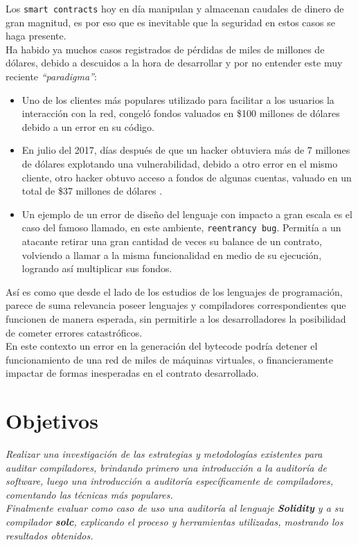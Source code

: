 Los \texttt{smart contracts} hoy en día manipulan y almacenan caudales de dinero de gran magnitud, es por eso que es inevitable que la seguridad en estos casos se haga presente.\\

Ha habido ya muchos casos registrados de pérdidas de miles de millones de dólares, debido a descuidos a la hora de desarrollar y por no entender este muy reciente \textit{“paradigma”}:
\begin{itemize}
\item Uno de los clientes más populares utilizado para facilitar a los usuarios la interacción con la red, congeló fondos valuados en \$100 millones de dólares debido a un error en su código\cite{Hertig:Alyssa:Coindesk}.
\item En julio del 2017, días después de que un hacker obtuviera más de 7 millones de dólares explotando una vulnerabilidad, debido a otro error en el mismo cliente, otro hacker obtuvo acceso a fondos de algunas cuentas, valuado en un total de \$37 millones de dólares \cite{Pearson:Jordan:Motherboard}.
\item Un ejemplo de un error de diseño del lenguaje con impacto a gran escala es el caso del famoso llamado, en este ambiente, \texttt{reentrancy bug}. Permitía a un atacante retirar una gran cantidad de veces su balance de un contrato, volviendo a llamar a la misma funcionalidad en medio de su ejecución, logrando así multiplicar sus fondos\cite{Vessenes:Peter:Vessenes}.
\end{itemize}
\bigskip

Así es como que desde el lado de los estudios de los lenguajes de programación, parece de suma relevancia poseer lenguajes y compiladores correspondientes que funcionen de manera esperada, sin permitirle a los desarrolladores la posibilidad de cometer errores catastróficos.\\

En este contexto un error en la generación del bytecode podría detener el funcionamiento de una red de miles de máquinas virtuales, o financieramente impactar de formas inesperadas en el contrato desarrollado.

\section{Objetivos}
\textit{Realizar una investigación de las estrategias y metodologías existentes para auditar compiladores, brindando primero una introducción a la auditoría de software, luego una introducción a auditoría específicamente de compiladores, comentando las técnicas más populares.}\\

\textit{Finalmente evaluar como caso de uso una auditoría al lenguaje \textbf{Solidity} y a su compilador \textbf{solc}, explicando el proceso y herramientas utilizadas, mostrando los resultados obtenidos.}
